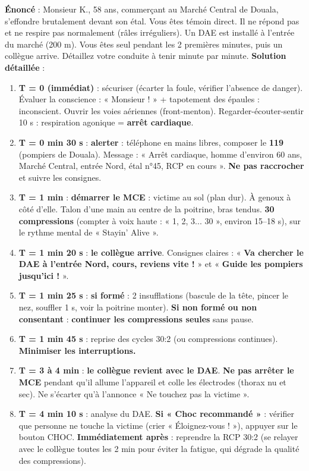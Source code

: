 \documentclass[11pt]{article}
\begin{document}
\begin{exoresolu}
\textbf{Énoncé} : Monsieur K., 58 ans, commerçant au Marché Central de Douala, s'effondre brutalement devant son étal. Vous êtes témoin direct. Il ne répond pas et ne respire pas normalement (râles irréguliers). Un DAE est installé à l'entrée du marché (200 m). Vous êtes seul pendant les 2 premières minutes, puis un collègue arrive. Détaillez votre conduite à tenir minute par minute.
\tcblower
\textbf{Solution détaillée} :
\begin{enumerate}
    \item \textbf{T = 0 (immédiat)} : sécuriser (écarter la foule, vérifier l'absence de danger). Évaluer la conscience : « Monsieur ! » + tapotement des épaules : inconscient. Ouvrir les voies aériennes (front-menton). Regarder-écouter-sentir 10 s : respiration agonique = \textbf{arrêt cardiaque}.
    \item \textbf{T = 0 min 30 s} : \textbf{alerter} : téléphone en mains libres, composer le \textbf{119} (pompiers de Douala). Message : « Arrêt cardiaque, homme d'environ 60 ans, Marché Central, entrée Nord, étal n°45, RCP en cours ». \textbf{Ne pas raccrocher} et suivre les consignes.
    \item \textbf{T = 1 min} : \textbf{démarrer le MCE} : victime au sol (plan dur). À genoux à côté d'elle. Talon d'une main au centre de la poitrine, bras tendus. \textbf{30 compressions} (compter à voix haute : « 1, 2, 3... 30 », environ 15--18 s), sur le rythme mental de « Stayin' Alive ».
    \item \textbf{T = 1 min 20 s} : \textbf{le collègue arrive}. Consignes claires : « \textbf{Va chercher le DAE à l'entrée Nord, cours, reviens vite !} » et « \textbf{Guide les pompiers jusqu'ici !} ».
    \item \textbf{T = 1 min 25 s} : \textbf{si formé} : 2 insufflations (bascule de la tête, pincer le nez, souffler 1 s, voir la poitrine monter). \textbf{Si non formé ou non consentant} : \textbf{continuer les compressions seules} sans pause.
    \item \textbf{T = 1 min 45 s} : reprise des cycles 30:2 (ou compressions continues). \textbf{Minimiser les interruptions.}
    \item \textbf{T = 3 à 4 min} : \textbf{le collègue revient avec le DAE}. \textbf{Ne pas arrêter le MCE} pendant qu'il allume l'appareil et colle les électrodes (thorax nu et sec). Ne s'écarter qu'à l'annonce « Ne touchez pas la victime ».
    \item \textbf{T = 4 min 10 s} : analyse du DAE. \textbf{Si « Choc recommandé »} : vérifier que personne ne touche la victime (crier « Éloignez-vous ! »), appuyer sur le bouton CHOC. \textbf{Immédiatement après} : reprendre la RCP 30:2 (se relayer avec le collègue toutes les 2 min pour éviter la fatigue, qui dégrade la qualité des compressions).

\end{enumerate}
\end{exoresolu}
\end{document}
